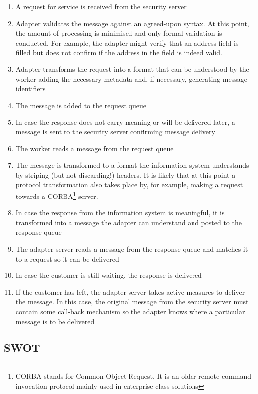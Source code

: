 \documentclass[10pt,a4paper]{article}
\begin{document}
\begin{enumerate}
	\item A request for service is received from the security server
	\item Adapter validates the message against an agreed-upon syntax. At this point, the amount of processing is minimised and only formal validation is conducted. For example, the adapter might verify that an address field is filled but does not confirm if the address in the field is indeed valid.
	\item Adapter transforms the request into a format that can be understood by the worker adding the necessary metadata and, if necessary, generating message identifiers
	\item The message is added to the request queue
	\item In case the response does not carry meaning or will be delivered later, a message is sent to the security server confirming message delivery
	\item The worker reads a message from the request queue 
	\item The message is transformed to a format the information system understands by striping (but not discarding!) headers. It is likely that at this point a protocol transformation also takes place by, for example, making a request towards a CORBA\footnote{CORBA stands for Common Object Request. It is an older remote command invocation protocol mainly used in enterprise-class solutions} server. 
	\item In case the response from the information system is meaningful, it is transformed into a message the adapter can understand and posted to the response queue
	\item The adapter server reads a message from the response queue and matches it to a request so it can be delivered
	\item In case the customer is still waiting, the response is delivered
	\item If the customer has left, the adapter server takes active measures to deliver the message. In this case, the original message from the security server must contain some call-back mechanism so the adapter knows where a particular message is to be delivered 
\end{enumerate}

\subsection{SWOT}
\end{document}
